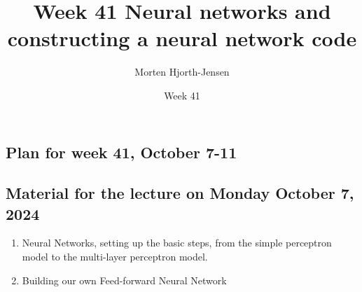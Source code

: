 \documentclass[%
oneside,                 %
final,                   %
10pt]{article}
\begin{document}

\newcommand{\exercisesection}[1]{\subsection*{#1}}






\title{Week 41 Neural networks and constructing a neural network code}


\author{Morten Hjorth-Jensen}

\date{Week 41
}

\subsection{Plan for week 41, October 7-11}

\subsection{Material for the lecture on Monday October 7, 2024}
\begin{enumerate}
\item Neural Networks, setting up the basic steps, from the simple perceptron model to the multi-layer perceptron model.

\item Building our own Feed-forward Neural Network
\end{enumerate}
\end{document}
